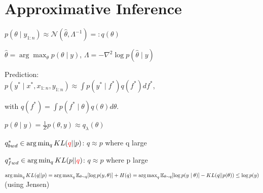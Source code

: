 \section{Approximative Inference} 
 $p(\theta\mid y_{1:n}) \approx \mathcal{N}(\hat{\theta}, \Lambda^{-1})=:q(\theta)$

$\hat{\theta} = \arg\max_\theta p(\theta \mid y)$, $\Lambda = - \nabla^2 \log p(\hat{\theta} \mid y)$

Prediction:
\\$p(y^*\mid x^*, x_{1:n}, y_{1:n}) \approx \int p(y^* \mid f^*) q(f^*) df^*$,

with $q(f^*) = \int p(f^* \mid \theta) q(\theta) d\theta$.


 ${p(\theta \mid y)} = \frac{1}{Z} p(\theta, y) \approx {q_\lambda(\theta)}$

$q_{bwd}^* \in \arg\min_{q} KL(\textcolor{red}{q} || {p})$: $q \approx p$ where q large

$q_{fwd}^* \in \arg\min_{q} KL({p} || \textcolor{red}{q})$: $q \approx p$ where p large

$\operatorname*{arg\,min}_q KL(q||p) \\
=\operatorname*{arg\,max}_q \mathbb{E}_{\theta \sim q}[\log p(y, \theta)] + H(q)\\
=\operatorname*{arg\,max}_q \mathbb{E}_{\theta \sim q}[\log p(y \mid\theta)] - KL(q||p(\theta))
\\\leq \log p(y)$ (using Jensen) 



